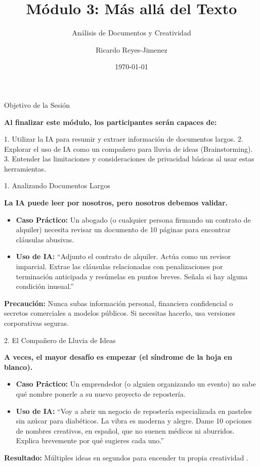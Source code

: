 \documentclass[aspectratio=169]{beamer}
\title[Módulo 3: Más allá del Texto]{Módulo 3: Más allá del Texto}
\subtitle{Análisis de Documentos y Creatividad}
\author{Ricardo Reyes-Jimenez}
\institute{IA para Todos}
\date{\today}
\begin{document}
\begin{frame}
  \titlepage
\end{frame}

\usebackgroundtemplate{}



\begin{frame}[fragile]{Objetivo de la Sesión}


\textbf{Al finalizar este módulo, los participantes serán capaces de:}

1. Utilizar la IA para resumir y extraer información de documentos largos.
2. Explorar el uso de IA como un compañero para lluvia de ideas (Brainstorming).
3. Entender las limitaciones y consideraciones de privacidad básicas al usar estas herramientas.

\end{frame}



\begin{frame}[fragile]{1. Analizando Documentos Largos}


\textbf{La IA puede leer por nosotros, pero nosotros debemos validar.}

\begin{itemize}
  \item \textbf{Caso Práctico:} Un abogado (o cualquier persona firmando un contrato de alquiler) necesita revisar un documento de 10 páginas para encontrar cláusulas abusivas.
  \item \textbf{Uso de IA:} ``Adjunto el contrato de alquiler. Actúa como un revisor imparcial. Extrae las cláusulas relacionadas con penalizaciones por terminación anticipada y resúmelas en puntos breves. Señala si hay alguna condición inusual.''
\end{itemize}
\textbf{Precaución:} Nunca subas información personal, financiera confidencial o secretos comerciales a modelos públicos. Si necesitas hacerlo, usa versiones corporativas seguras.

\end{frame}



\begin{frame}[fragile]{2. El Compañero de Lluvia de Ideas}


\textbf{A veces, el mayor desafío es empezar (el síndrome de la hoja en blanco).}

\begin{itemize}
  \item \textbf{Caso Práctico:} Un emprendedor (o alguien organizando un evento) no sabe qué nombre ponerle a su nuevo proyecto de repostería.
  \item \textbf{Uso de IA:} ``Voy a abrir un negocio de repostería especializada en pasteles sin azúcar para diabéticos. La vibra es moderna y alegre. Dame 10 opciones de nombres creativos, en español, que no suenen médicos ni aburridos. Explica brevemente por qué sugieres cada uno.''
\end{itemize}
\textbf{Resultado:} Múltiples ideas en segundos para encender tu propia creatividad \cite{brynjolfsson2023}.

\end{frame}
\end{document}
